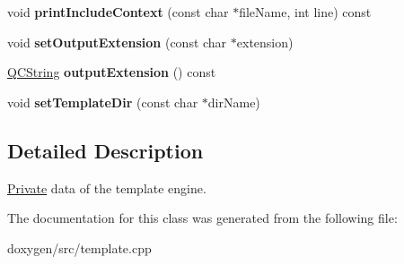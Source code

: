 \begin{DoxyCompactItemize}
void {\bfseries print\+Include\+Context} (const char $\ast$file\+Name, int line) const
\item 
\mbox{\label{class_template_engine_1_1_private_aad39f63314e1220258fdf05cb63c0f72}} 
void {\bfseries set\+Output\+Extension} (const char $\ast$extension)
\item 
\mbox{\label{class_template_engine_1_1_private_acaa7891a0b410b4ec3a5b347fd92445f}} 
\mbox{\hyperlink{class_q_c_string}{Q\+C\+String}} {\bfseries output\+Extension} () const
\item 
\mbox{\label{class_template_engine_1_1_private_a574a2edafae169b05a7d3b2498083d20}} 
void {\bfseries set\+Template\+Dir} (const char $\ast$dir\+Name)
\end{DoxyCompactItemize}


\subsection{Detailed Description}
\mbox{\hyperlink{class_template_engine_1_1_private}{Private}} data of the template engine. 

The documentation for this class was generated from the following file\+:\begin{DoxyCompactItemize}
\item 
doxygen/src/template.\+cpp\end{DoxyCompactItemize}
